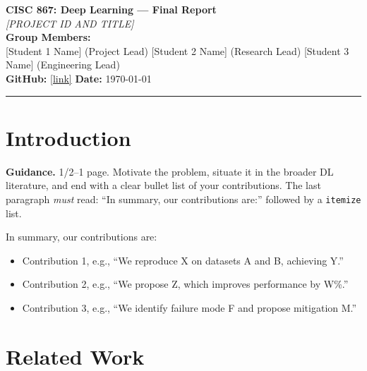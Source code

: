 \documentclass[11pt, letterpaper]{article}
\begin{document}
{\centering
  {\Large\textbf{CISC 867: Deep Learning --- Final Report}}\\[0.5em]
  {\large\textit{[PROJECT ID AND TITLE]}}\\[0.4em]
  \textbf{Group Members:}\\
  {[Student 1 Name]} (Project Lead) \quad
  {[Student 2 Name]} (Research Lead) \quad
  {[Student 3 Name]} (Engineering Lead)\\[0.3em]
  \textbf{GitHub:} \url{[link]} \quad \textbf{Date:} \today\\[0.4em]
  \rule{\linewidth}{0.4pt}
}

\begin{abstract}
\begin{guidancebox}
\textbf{Guidance.} 200--250 words. State: (1) the problem, (2) your method,
(3) your main result compared to baselines, and (4) your novel contribution.
\end{guidancebox}
[WRITE YOUR ABSTRACT HERE. Include your best headline number.]
\end{abstract}

\section{Introduction}

\begin{guidancebox}
\textbf{Guidance.} 1/2--1 page. Motivate the problem, situate it in the
broader DL literature, and end with a clear bullet list of your contributions.
The last paragraph \emph{must} read: ``In summary, our contributions are:''
followed by a \texttt{itemize} list.
\end{guidancebox}


In summary, our contributions are:
\begin{itemize}[noitemsep]
  \item Contribution 1, e.g., ``We reproduce X on datasets A and B, achieving Y.''
  \item Contribution 2, e.g., ``We propose Z, which improves performance by W\%.''
  \item Contribution 3, e.g., ``We identify failure mode F and propose mitigation M.''
\end{itemize}

\section{Related Work}
\end{document}
